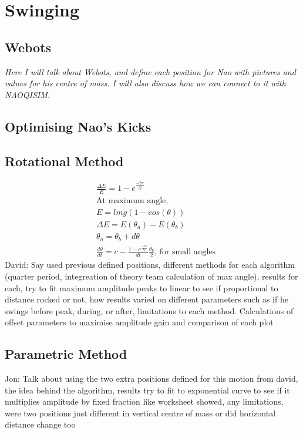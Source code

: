 \documentclass[11pt]{article}
\newcommand*\ruleline[1]{\par\noindent\raisebox{.8ex}{\makebox[\linewidth]{\hrulefill\hspace{1ex}\raisebox{-.8ex}{#1}\hspace{1ex}\hrulefill}}}
\begin{document}
\section{Swinging}

\subsection{Webots}
\ruleline{James Doering}
\textit{Here I will talk about Webots, and define each position for Nao with pictures and values for his centre of mass. I will also discuss how we can connect to it with NAOQISIM.}

\subsection{Optimising Nao's Kicks}

\subsection{Rotational Method}

\begin{align}
    &\frac{\Delta E}{E} = 1 - e^{\frac{-2\pi}{Q}}\\
    &\text{At maximum angle},\\
    &E = lmg(1-cos(\theta))\\
    &\Delta E = E(\theta_a) - E(\theta_b)\\
    &\theta_a = \theta_b + d\theta\\
    &\frac{d\theta}{dt} = c - \frac{1-e^{\frac{-2\pi}{Q}}}{dt}\frac{\theta_b}{2}, \, \text{for small angles}
\end{align}
David: Say used previous defined positions, different methods for each algorithm (quarter period, integreation of theory team calculation of max angle), results for each, try to fit maximum amplitude peaks to linear to see if proportional to distance rocked or not, how results varied on different parameters such as if he swings before peak, during, or after, limitations to each method.
Calculations of offset parameters to maximise amplitude gain and comparison of each plot

\subsection{Parametric Method}
Jon: Talk about using the two extra positions defined for this motion from david, the idea behind the algorithm, results try to fit to exponential curve to see if it multiplies amplitude by fixed fraction like worksheet showed, any limitations, were two positions just different in vertical centre of mass or did horizontal distance change too
\end{document}
